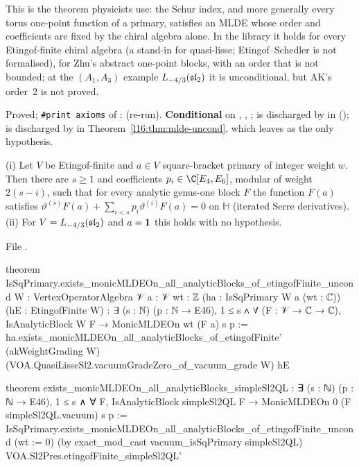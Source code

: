 \begin{physics}
This is the theorem physicists use: the Schur index, and more generally every torus one-point function of a primary,
satisfies an MLDE whose order and coefficients are fixed by the chiral algebra alone. In the library it holds for every
Etingof-finite chiral algebra (a stand-in for quasi-lisse; Etingof--Schedler is not formalised), for Zhu's abstract
one-point blocks, with an order that is not bounded; at the $(A_1,A_3)$ example $L_{-4/3}(\mathfrak{sl}_2)$ it is
unconditional, but AK's order~2 is not proved.
\end{physics}

\begin{status}
Proved; \texttt{\#print axioms} of \allowbreak{}\allowbreak{}\allowbreak{}\allowbreak{}:
\lean{[propext, Classical.}\allowbreak{}\allowbreak\lean{sound]} (re-run). \textbf{Conditional} on , ,
;  is discharged by  in \allowbreak{}\allowbreak{}\allowbreak{}\allowbreak{}
();  is discharged by  in
Theorem~\ref{l16:thm:mlde-uncond}, which leaves  as the only hypothesis.
\end{status}

\begin{theorem}\label{l16:thm:mlde-uncond}
(i) Let $V$ be Etingof-finite and $a\in V$ square-bracket primary of integer weight $w$. Then there are $s\ge1$ and
coefficients $p_i\in\C[E_4,E_6]$, modular of weight $2(s-i)$, such that for every analytic genus-one block $F$ the
function $F(a)$ satisfies $\vartheta^{(s)}F(a)+\sum_{i<s}p_i\vartheta^{(i)}F(a)=0$ on $\mathbb H$ (iterated Serre
derivatives). (ii) For $V=L_{-4/3}(\mathfrak{sl}_2)$ and $a=\mathbf{1}$ this holds with no hypothesis.
\end{theorem}
\noindent File .
\begin{leancode}
theorem IsSqPrimary.exists_monicMLDEOn_all_analyticBlocks_of_etingofFinite_uncond
    {W : VertexOperatorAlgebra 𝒱} {a : 𝒱} {wt : ℤ}
    (ha : IsSqPrimary W a (wt : ℂ)) (hE : EtingofFinite W) :
    ∃ (s : ℕ) (p : ℕ → E46), 1 ≤ s ∧
      ∀ (F : 𝒱 → ℂ → ℂ), IsAnalyticBlock W F → MonicMLDEOn wt (F a) s p :=
  ha.exists_monicMLDEOn_all_analyticBlocks_of_etingofFinite' (akWeightGrading W)
    (VOA.QuasiLisseSl2.vacuumGradeZero_of_vacuum_grade W) hE

theorem exists_monicMLDEOn_all_analyticBlocks_simpleSl2QL :
    ∃ (s : ℕ) (p : ℕ → E46), 1 ≤ s ∧
      ∀ F, IsAnalyticBlock simpleSl2QL F →
        MonicMLDEOn 0 (F simpleSl2QL.vacuum) s p :=
  IsSqPrimary.exists_monicMLDEOn_all_analyticBlocks_of_etingofFinite_uncond
    (wt := 0) (by exact_mod_cast vacuum_isSqPrimary simpleSl2QL) VOA.Sl2Pres.etingofFinite_simpleSl2QL'
\end{leancode}

